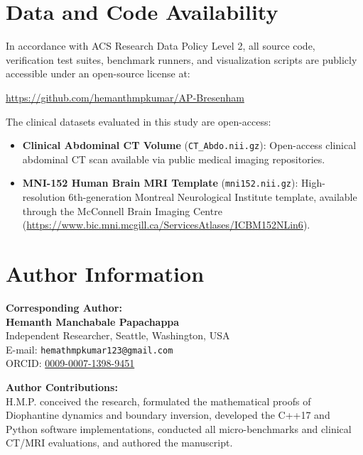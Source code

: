 \documentclass[journal=dme,manuscript=article,11pt]{article}
\begin{document}
\section{Data and Code Availability}
In accordance with ACS Research Data Policy Level 2, all source code, verification test suites, benchmark runners, and visualization scripts are publicly accessible under an open-source license at:
\begin{center}
\url{https://github.com/hemanthmpkumar/AP-Bresenham}
\end{center}
The clinical datasets evaluated in this study are open-access:
\begin{itemize}
    \item \textbf{Clinical Abdominal CT Volume} (\texttt{CT\_Abdo.nii.gz}): Open-access clinical abdominal CT scan available via public medical imaging repositories.
    \item \textbf{MNI-152 Human Brain MRI Template} (\texttt{mni152.nii.gz}): High-resolution 6th-generation Montreal Neurological Institute template, available through the McConnell Brain Imaging Centre (\url{https://www.bic.mni.mcgill.ca/ServicesAtlases/ICBM152NLin6}).
\end{itemize}

\section*{Author Information}
\textbf{Corresponding Author:}\\
\textbf{Hemanth Manchabale Papachappa}\\
Independent Researcher, Seattle, Washington, USA\\
E-mail: \texttt{hemathmpkumar123@gmail.com}\\
ORCID: \href{https://orcid.org/0009-0007-1398-9451}{0009-0007-1398-9451}

\vspace{0.2cm}
\noindent \textbf{Author Contributions:}\\
H.M.P. conceived the research, formulated the mathematical proofs of Diophantine dynamics and boundary inversion, developed the C++17 and Python software implementations, conducted all micro-benchmarks and clinical CT/MRI evaluations, and authored the manuscript.
\end{document}
